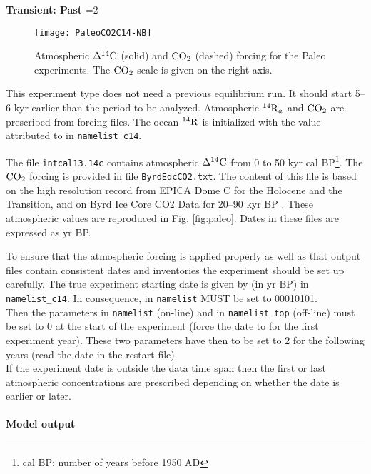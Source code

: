 \documentclass[../main/TOP_manual]{subfiles}
\begin{document}
%
\textbf{Transient: Past}
=2
%
\begin{figure}[!h]
\begin{center}
\texttt{[image: PaleoCO2C14-NB]}
\end{center}
\vspace{-4ex}
\caption{Atmospheric $\Delta ^{14}\mathrm{C}$ (solid) and $\mathrm{CO_2}$ (dashed)  forcing for the Paleo experiments.
The $\mathrm{CO_2}$ scale is given on the right axis.} \label{fig:paleo}
\end{figure}

This experiment type does not need a previous equilibrium run.
It should start 5--6 kyr earlier than the period to be analyzed.
Atmospheric $\mathrm{^{14}{R}}_a$ and $\mathrm{CO_2}$ are prescribed from forcing files.
The ocean $\mathrm{^{14}{R}}$ is initialized with the value attributed to  in \texttt{namelist\_c14}.

The file \texttt{intcal13.14c} \citep{reimer_2013} contains atmospheric $\Delta ^{14}\mathrm{C}$ from 0 to 50 kyr cal BP\footnote{cal BP: number of years before 1950 AD}.
The $\mathrm{CO_2}$ forcing is provided in file \texttt{ByrdEdcCO2.txt}.
The content of this file is based on  the high resolution record from EPICA Dome C \citep{monnin_2004} for the Holocene and the Transition, and on Byrd Ice Core CO2 Data for 20--90 kyr BP  \citep{ahn_2008}.
These atmospheric values are reproduced in Fig. \autoref{fig:paleo}.
Dates in these files are expressed as yr BP.

To ensure that the atmospheric forcing is applied properly as well as that output files contain consistent dates and inventories the experiment should be set up carefully.
The true experiment starting date is given by  (in yr BP) in \texttt{namelist\_c14}.
In consequence,  in \texttt{namelist} MUST be set to 00010101.\\
Then the parameters  in  \texttt{namelist} (on-line) and  in \texttt{namelist\_top} (off-line)  must be set to 0 at the start of the experiment (force the date to  for the first experiment year).
These two parameters have then to be set to 2 for the following years (read the date in the restart file). \\
If the experiment date is outside the data time span then the first or last atmospheric concentrations are prescribed depending on whether the date is earlier or later.

%
\paragraph{Model output}
\label{sec:output}
\end{document}

